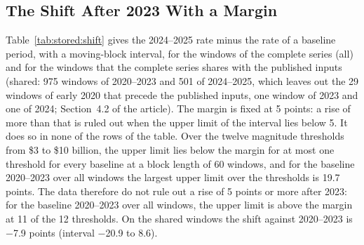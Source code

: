 \subsection{The Shift After 2023 With a Margin}
\label{sup:stored:e4}

Table~\ref{tab:stored:shift} gives the 2024--2025 rate minus the rate of a baseline period, with a moving-block interval, for the windows of the complete series (all) and for the windows that the complete series shares with the published inputs (shared: 975 windows of 2020--2023 and 501 of 2024--2025, which leaves out the 29 windows of early 2020 that precede the published inputs, one window of 2023 and one of 2024; Section~4.2 of the article). The margin is fixed at 5 points: a rise of more than that is ruled out when the upper limit of the interval lies below 5. It does so in none of the rows of the table. Over the twelve magnitude thresholds from \$3 to \$10 billion, the upper limit lies below the margin for at most one threshold for every baseline at a block length of 60 windows, and for the baseline 2020--2023 over all windows the largest upper limit over the thresholds is 19.7 points. The data therefore do not rule out a rise of 5 points or more after 2023: for the baseline 2020--2023 over all windows, the upper limit is above the margin at 11 of the 12 thresholds. On the shared windows the shift against 2020--2023 is $-$7.9 points (interval $-$20.9 to 8.6).

